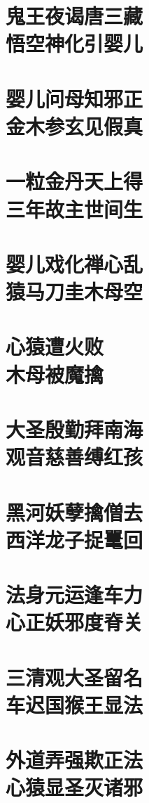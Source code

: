 \documentclass[a4paper,12pt,UTF8,twoside]{ctexbook}
\begin{document}
\chapter[鬼王夜谒唐三藏\ 悟空神化引婴儿]{鬼王夜谒唐三藏\\悟空神化引婴儿}
\chapter[婴儿问母知邪正\ 金木参玄见假真]{婴儿问母知邪正\\金木参玄见假真}
\chapter[一粒金丹天上得\ 三年故主世间生]{一粒金丹天上得\\三年故主世间生}
\chapter[婴儿戏化禅心乱\ 猿马刀圭木母空]{婴儿戏化禅心乱\\猿马刀圭木母空}
\chapter[心猿遭火败\ 木母被魔擒]{心猿遭火败\\木母被魔擒}
\chapter[大圣殷勤拜南海\ 观音慈善缚红孩]{大圣殷勤拜南海\\观音慈善缚红孩}
\chapter[黑河妖孽擒僧去\ 西洋龙子捉鼍回]{黑河妖孽擒僧去\\西洋龙子捉鼍回}
\chapter[法身元运逢车力\ 心正妖邪度脊关]{法身元运逢车力\\心正妖邪度脊关}
\chapter[三清观大圣留名\ 车迟国猴王显法]{三清观大圣留名\\车迟国猴王显法}
\chapter[外道弄强欺正法\ 心猿显圣灭诸邪]{外道弄强欺正法\\心猿显圣灭诸邪}
\end{document}
